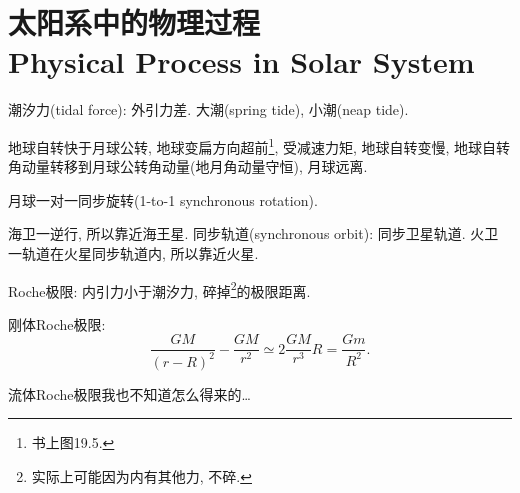\chapter{太阳系中的物理过程\\Physical Process in Solar System}

潮汐力(tidal force): 外引力差. 大潮(spring tide), 小潮(neap tide).

地球自转快于月球公转, 地球变扁方向超前\footnote{书上图19.5.}, 受减速力矩, 地球自转变慢, 地球自转角动量转移到月球公转角动量(地月角动量守恒), 月球远离.

月球一对一同步旋转(1-to-1 synchronous rotation).

海卫一逆行, 所以靠近海王星. 同步轨道(synchronous orbit): 同步卫星轨道. 火卫一轨道在火星同步轨道内, 所以靠近火星.

Roche极限: 内引力小于潮汐力, 碎掉\footnote{实际上可能因为内有其他力, 不碎.}的极限距离.

刚体Roche极限:
\begin{equation*}
    \frac{GM}{(r-R)^2}-\frac{GM}{r^2}\simeq2\frac{GM}{r^3}R=\frac{Gm}{R^2}.
\end{equation*}

流体Roche极限我也不知道怎么得来的\dots
